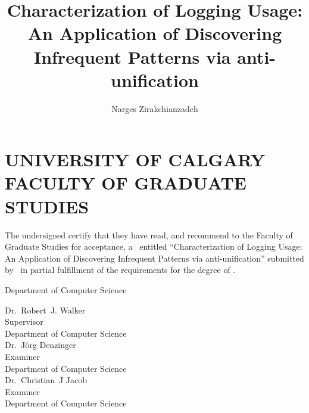 \documentclass{ucalgthes1}
\title{Characterization of Logging Usage:\\An Application of Discovering Infrequent Patterns via anti-unification}
\author{Narges Zirakchianzadeh}
\theoremstyle{plain}
\theoremstyle{definition}
\newcommand{\thestitle}{Characterization of Logging Usage: An Application of Discovering Infrequent Patterns via anti-unification}
\begin{document}
\makethesistitle
{}     %
\setcounter{page}{1}


\chapter*{UNIVERSITY OF CALGARY \\ FACULTY OF GRADUATE STUDIES}
\thispagestyle{empty}
The undersigned certify that they have read, and recommend
to the Faculty of Graduate Studies for acceptance, a \Thesis\ entitled
``\thestitle'' submitted by \Author\
in partial fulfillment of the requirements for the degree of
\Degree.\\

%
%

\begin{signing}{Department of Computer Science}

\newsigncolumn

\signline
Dr.~Robert~J. Walker \\
Supervisor \\
Department of Computer Science  \\


\signline
Dr.~J{\"o}rg Denzinger \\
Examiner \\
Department of  Computer Science \\

\signline
Dr.~Christian~J Jacob \\
Examiner \\
Department of  Computer Science \\
\end{signing}

\newpage
{}
{}
\end{document}
